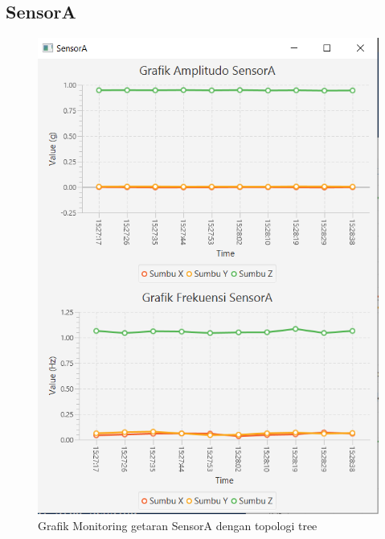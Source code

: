 \subsection{SensorA}
\begin{figure}[H] 
	\centering  
	\includegraphics[scale=1]{Lampiran/HasilPengujian/sensorA_treeRooftop.PNG} 
	\caption[Grafik Monitoring getaran SensorA dengan topologi tree]{Grafik Monitoring getaran SensorA dengan topologi tree}
	\label{fig:grafik_A_tree_rooftop} 
\end{figure}


